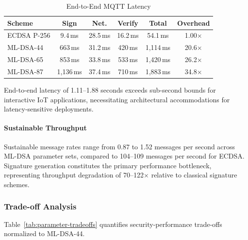 \documentclass[final, twoside]{IEEEtran} %
\begin{document}
\begin{table}[h]
	\centering
	\caption{End-to-End MQTT Latency}
	\label{tab:e2e-latency}
	\begin{tabular}{lccccc}
		\toprule
		\textbf{Scheme} & \textbf{Sign} & \textbf{Net.} & \textbf{Verify} & \textbf{Total} & \textbf{Overhead} \\
		\midrule
		ECDSA P-256     & 9.4\,ms       & 28.5\,ms      & 16.2\,ms        & 54.1\,ms       & 1.00$\times$      \\
		ML-DSA-44       & 663\,ms       & 31.2\,ms      & 420\,ms         & 1,114\,ms      & 20.6$\times$      \\
		ML-DSA-65       & 853\,ms       & 33.8\,ms      & 533\,ms         & 1,420\,ms      & 26.2$\times$      \\
		ML-DSA-87       & 1,136\,ms     & 37.4\,ms      & 710\,ms         & 1,883\,ms      & 34.8$\times$      \\
		\bottomrule
	\end{tabular}
\end{table}

End-to-end latency of 1.11--1.88 seconds exceeds sub-second bounds for interactive IoT applications, necessitating architectural accommodations for latency-sensitive deployments.

\paragraph{Sustainable Throughput}

Sustainable message rates range from 0.87 to 1.52 messages per second across ML-DSA parameter sets, compared to 104--109 messages per second for ECDSA. Signature generation constitutes the primary performance bottleneck, representing throughput degradation of 70--122$\times$ relative to classical signature schemes.

\subsubsection{Trade-off Analysis}

Table~\ref{tab:parameter-tradeoffs} quantifies security-performance trade-offs normalized to ML-DSA-44.
\end{document}
